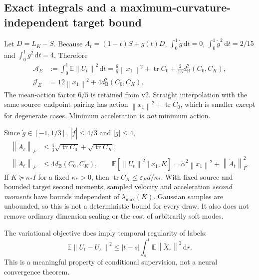 \documentclass[11pt,letterpaper]{article}
\newcommand{\E}{\mathbb E}
\newcommand{\epsE}{\varepsilon_E}
\newcommand{\tr}{\operatorname{tr}}
\newcommand{\dd}{\,\mathrm d}
\newcommand{\norm}[1]{\left\lVert#1\right\rVert}
\newcommand{\bures}{d_{\mathrm B}}
\newcommand{\J}{\mathcal J}
\begin{document}
\subsection{Exact integrals and a maximum-curvature-independent target bound}
Let $D=L_K-S$. Because $A_t=(1-t)S+g(t)D$, $\int_0^1\dot g\dd t=0$, $\int_0^1\dot g^2\dd t=2/15$ and $\int_0^1\ddot g^2\dd t=4$. Therefore
\begin{equation}
\boxed{\begin{aligned}
\mathcal A_E&:=\int_0^1\E\norm{U_t}^2\dd t
=\tfrac65\norm{x_1}^2+\tr C_0+\tfrac{2}{15}\bures^2(C_0,C_K),\\
\J_E&=12\norm{x_1}^2+4\bures^2(C_0,C_K).
\end{aligned}}
\label{eq:integrals}
\end{equation}
The mean-action factor $6/5$ is retained from v2. Straight interpolation with the same source--endpoint pairing has action $\norm{x_1}^2+\tr C_0$, which is smaller except for degenerate cases. Minimum acceleration is \emph{not} minimum action.

Since $\dot g\in[-1,1/3]$, $|\dot f|\leq4/3$ and $|\ddot g|\leq4$,
\begin{equation}
\begin{split}
\norm{\dot A_t}_F&\leq\tfrac43\sqrt{\tr C_0}+\sqrt{\tr C_K},\\
\norm{\ddot A_t}_F&\leq4\bures(C_0,C_K),\qquad
\E[\norm{U_t}^2\mid x_1,K]=\dot\alpha^2\norm{x_1}^2+\norm{\dot A_t}_F^2.
\end{split}
\label{eq:target-bound}
\end{equation}
If $K\succeq\kappa_*I$ for a fixed $\kappa_*>0$, then $\tr C_K\leq\epsE d/\kappa_*$. With fixed source and bounded target second moments, sampled velocity and acceleration \emph{second moments} have bounds independent of $\lambda_{\max}(K)$. Gaussian samples are unbounded, so this is not a deterministic bound for every draw. It also does not remove ordinary dimension scaling or the cost of arbitrarily soft modes.

The variational objective does imply temporal regularity of labels:
\begin{equation}
\E\norm{U_t-U_s}^2\leq |t-s|\int_s^t\E\norm{\ddot X_r}^2\dd r.
\label{eq:time-regularity}
\end{equation}
This is a meaningful property of conditional supervision, not a neural convergence theorem.
\end{document}
